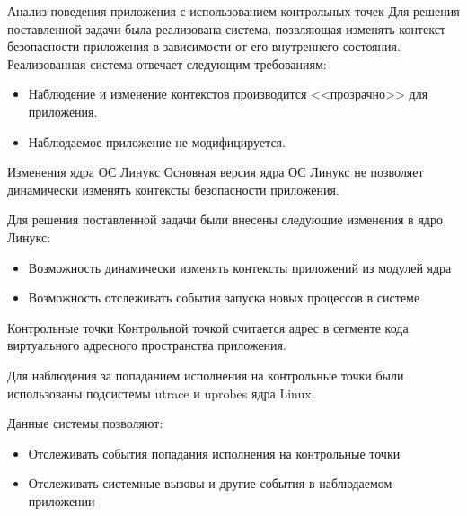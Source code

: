 \documentclass{beamer}
\begin{document}
\begin{frame}{Анализ поведения приложения с использованием контрольных точек}
Для решения поставленной задачи была реализована система,
позвляющая изменять контекст безопасности приложения в зависимости
от его внутреннего состояния.
Реализованная система отвечает следующим требованиям:
\begin{itemize}
\item Наблюдение и изменение контекстов производится
        <<прозрачно>> для приложения.
\item Наблюдаемое приложение не модифицируется.
\end{itemize}

\end{frame}
\begin{frame}{Изменения ядра ОС Линукс}
Основная версия ядра ОС Линукс не позволяет динамически
изменять контексты безопасности приложения.

Для решения поставленной задачи были внесены следующие
изменения в ядро Линукс:

\begin{itemize}
\item Возможность динамически изменять контексты приложений
        из модулей ядра
\item Возможность отслеживать события запуска новых процессов
        в системе
\end{itemize}
\end{frame}
 


 

\begin{frame}[fragile]{Контрольные точки}
Контрольной точкой считается адрес в сегменте кода
виртуального адресного пространства приложения.

Для наблюдения за попаданием исполнения на контрольные
точки были использованы подсистемы utrace и uprobes
ядра Linux.

Данные системы позволяют:
\begin{itemize}
\item Отслеживать события попадания исполнения на контрольные точки
\item Отслеживать системные вызовы и другие события в наблюдаемом приложении
\end{itemize}

\end{frame}
\end{document}
